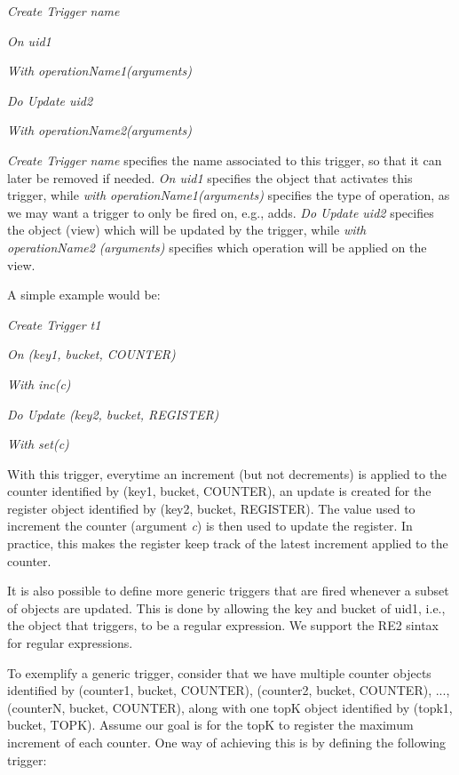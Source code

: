 \documentclass{vldb}
\newcommand{\emphvspace}{0.5\baselineskip}
\newcommand{\firstblockemph}[1]{\vspace{\emphvspace}\hspace{2em}\emph{#1}}
\newcommand{\middleblockemph}[1]{\hspace{2em}\emph{#1}}
\newcommand{\lastblockemph}[1]{\hspace{2em}\emph{#1}\vspace{\emphvspace}}
\begin{document}
\firstblockemph{Create Trigger name}

\middleblockemph{On uid1}

\middleblockemph{With operationName1(arguments)}

\middleblockemph{Do Update uid2}

\lastblockemph{With operationName2(arguments)}

\emph{Create Trigger name} specifies the name associated to this trigger, so that it can later be removed if needed.
\emph{On uid1} specifies the object that activates this trigger, while \emph{with operationName1(arguments)} specifies the type of operation, as we may want a trigger to only be fired on, e.g., adds.
\emph{Do Update uid2} specifies the object (view) which will be updated by the trigger, while \emph{with}  \emph{operationName2} \emph{(arguments)} specifies which operation will be applied on the view.

A simple example would be:

\firstblockemph{Create Trigger t1}

\middleblockemph{On (key1, bucket, COUNTER)}

\middleblockemph{With inc(c)}

\middleblockemph{Do Update (key2, bucket, REGISTER)}

\lastblockemph{With set(c)}

With this trigger, everytime an increment (but not decrements) is applied to the counter identified by (key1, bucket, COUNTER), an update is created for the register object identified by (key2, bucket, REGISTER).
The value used to increment the counter (argument \emph{c}) is then used to update the register.
In practice, this makes the register keep track of the latest increment applied to the counter.

It is also possible to define more generic triggers that are fired whenever a subset of objects are updated.
This is done by allowing the key and bucket of uid1, i.e., the object that triggers, to be a regular expression.
We support the RE2 \cite{RE2sintax} sintax for regular expressions.

To exemplify a generic trigger, consider that we have multiple counter objects identified by (counter1, bucket, COUNTER), (counter2, bucket, COUNTER), ..., (counterN, bucket, COUNTER), along with one topK object identified by (topk1, bucket, TOPK).
Assume our goal is for the topK to register the maximum increment of each counter.
One way of achieving this is by defining the following trigger:
\end{document}
